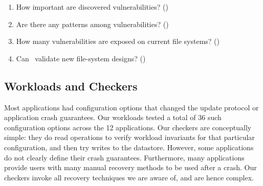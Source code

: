 \begin{enumerate}[topsep=0pt, itemsep=-1ex, partopsep=1ex, parsep=1ex]
\vspace{-0.03in}
%
\item How important are discovered vulnerabilities? ()
\item Are there any patterns among vulnerabilities? ()
\item How many vulnerabilities are exposed on current file systems? ()
\item Can \toolname\ validate new file-system designs? ()
\vspace{-0.03in}
\end{enumerate}

\subsection{Workloads and Checkers}
\label{sec-workload}
Most applications had configuration options that changed the update protocol or
application crash guarantees. Our workloads tested a total of 36
such configuration options across the 12 applications. 
Our checkers are conceptually simple: they do read operations to verify
workload invariants for that particular configuration, and then try writes to
the datastore. However, some applications do not clearly define their crash
guarantees.  Furthermore, many applications provide users with many manual
recovery methods to be used after a crash. Our checkers invoke all recovery
techniques we are aware of, and are hence complex. 

